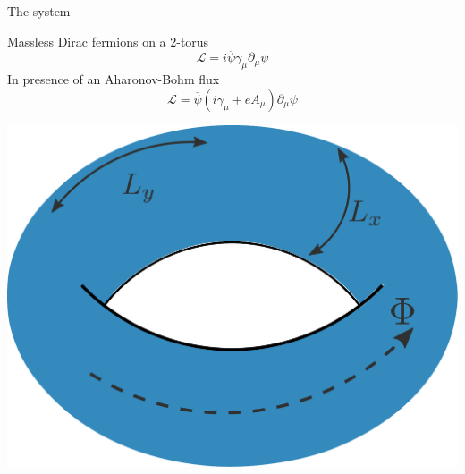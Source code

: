 \documentclass[11pt,aspectratio=169]{beamer}
\begin{document}
\begin{frame}{The system}

\begin{minipage}{0.5\textwidth}
{Massless Dirac fermions on a 2-torus}
\[\mathcal{L} = i\overline\psi\gamma_\mu\partial_\mu \psi\]
{In presence of an Aharonov-Bohm flux}
\[\mathcal{L} = \overline\psi \left(i\gamma_\mu + eA_\mu\right)\partial_\mu \psi\]
\end{minipage}
\begin{minipage}{0.4\textwidth}
\includegraphics[width=\textwidth]{figures/torus.pdf}
\end{minipage}

\end{frame}
\end{document}
